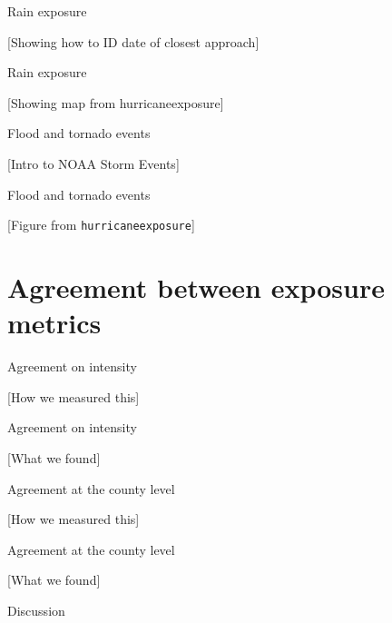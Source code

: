 \documentclass[ignorenonframetext,]{beamer}
\begin{document}
\begin{frame}{Rain exposure}

{[}Showing how to ID date of closest approach{]}

\end{frame}

\begin{frame}{Rain exposure}

{[}Showing map from hurricaneexposure{]}

\end{frame}

\begin{frame}{Flood and tornado events}

{[}Intro to NOAA Storm Events{]}

\end{frame}

\begin{frame}[fragile]{Flood and tornado events}

{[}Figure from \texttt{hurricaneexposure}{]}

\end{frame}

\section{Agreement between exposure
metrics}\label{agreement-between-exposure-metrics}

\begin{frame}{Agreement on intensity}

{[}How we measured this{]}

\end{frame}

\begin{frame}{Agreement on intensity}

{[}What we found{]}

\end{frame}

\begin{frame}{Agreement at the county level}

{[}How we measured this{]}

\end{frame}

\begin{frame}{Agreement at the county level}

{[}What we found{]}

\end{frame}

\begin{frame}{Discussion}

\end{frame}
\end{document}
